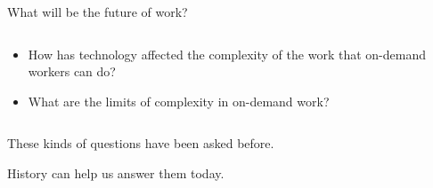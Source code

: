 \documentclass[presentation]{subfiles}
\begin{document}
\begin{frame}{What will be the future of work?}
  \begin{columns}
    \begin{column}{0.6\textwidth}
      \begin{itemize}
        \item<+-> How has \alert{technology} affected the complexity of the work that on-demand workers can do?
        \item<+-> What are the \alert{limits} of complexity in on-demand work?
      \end{itemize}
    \end{column}
    \begin{column}{0.4\textwidth}
    \end{column}
    \end{columns}
\end{frame}


\begin{frame}[standout]
    These kinds of questions have been asked before.

    History can help us answer them today.
\end{frame}
\end{document}
